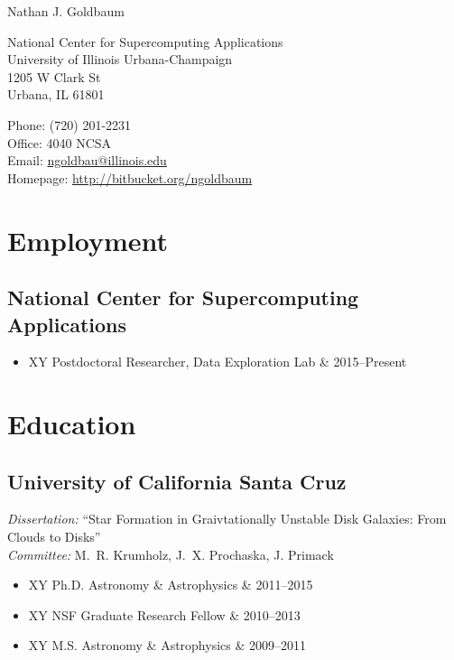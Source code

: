 \documentclass[10pt,letterpaper]{article}
\def\name{Nathan J. Goldbaum}
\newcommand{\textline}[2]{
  \begin{tabularx}{\textwidth}{XY}
  #1 & #2
  \end{tabularx}
}
\begin{document}
{\huge \name}


\bigskip

\begin{minipage}[t]{0.6\textwidth}
  National Center for Supercomputing Applications \\
  University of Illinois Urbana-Champaign \\
  1205 W Clark St \\
  Urbana, IL 61801
\end{minipage}
\begin{minipage}[t]{0.4\textwidth}
  Phone: (720) 201-2231 \\
  Office: 4040 NCSA \\
  Email: \href{mailto:ngoldbau@illinois.edu}{ngoldbau@illinois.edu} \\
  Homepage: \href{https://bitbucket.org/ngoldbaum}{http://bitbucket.org/ngoldbaum}
\end{minipage}

\section*{Employment}

\subsection*{National Center for Supercomputing Applications}
  \begin{itemize}
    \item[] \textline{Postdoctoral Researcher, Data Exploration Lab}{2015--Present}
  \end{itemize}

\section*{Education}

\subsection*{University of California Santa Cruz}
\emph{Dissertation:} ``Star Formation in Graivtationally Unstable Disk
Galaxies: From Clouds to Disks''\\
\emph{Committee:} M.~R. Krumholz, J.~X. Prochaska, J. Primack
\begin{itemize}
\item[] \textline{Ph.D. Astronomy \& Astrophysics}{2011--2015}
\item[] \textline{NSF Graduate Research Fellow}{2010--2013}
\item[] \textline{M.S. Astronomy \& Astrophysics}{2009--2011}
\end{itemize}
\end{document}

